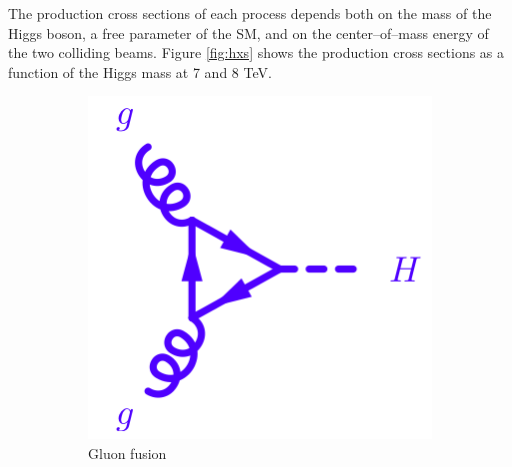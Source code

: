 The production cross sections of each process depends both on the mass of the Higgs boson, a free parameter of the SM, and on the center--of--mass energy of the two colliding beams. Figure \ref{fig:hxs} shows the production cross sections as a function of the Higgs mass at 7 and 8 TeV.

\begin{figure}
        \centering
        \begin{subfigure}[b]{0.3\textwidth}
                \includegraphics[width=\textwidth]{1_Introduction_Th_and_Exp/pics/ggFusion.png}
                \caption{Gluon fusion}
                \label{fig:ggf}
        \end{subfigure}%
        ~ 
        \begin{subfigure}[b]{0.3\textwidth}

\end{subfigure}
\end{figure}
